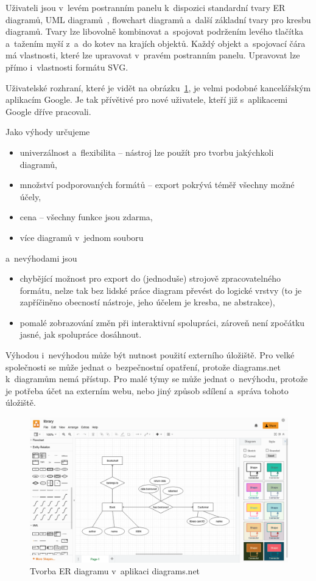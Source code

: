Uživateli jsou v~levém postranním panelu k~dispozici standardní tvary ER diagramů, UML diagramů~\cite{uml2017}, flowchart diagramů a~další základní tvary pro kresbu diagramů.
Tvary lze libovolně kombinovat a~spojovat podržením levého tlačítka a~tažením myší z~a~do kotev na krajích objektů.
Každý objekt a~spojovací čára má vlastnosti, které lze upravovat v~pravém postranním panelu.
Upravovat lze přímo i~vlastnosti formátu SVG.

Uživatelské rozhraní, které je vidět na obrázku~\ref{fig:diagrams.net}, je velmi podobné kancelářským aplikacím Google.
Je tak přívětivé pro nové uživatele, kteří již s~aplikacemi Google dříve pracovali.

Jako výhody určujeme
\begin{itemize}
  \item univerzálnost a~flexibilita -- nástroj lze použít pro tvorbu jakýchkoli diagramů,
  \item množství podporovaných formátů -- export pokrývá téměř všechny možné účely,
  \item cena -- všechny funkce jsou zdarma,
  \item více diagramů v~jednom souboru
\end{itemize}
a~nevýhodami jsou
\begin{itemize}
  \item chybějící možnost pro export do (jednoduše) strojově zpracovatelného formátu, nelze tak bez lidské práce diagram převést do logické vrstvy (to je zapříčiněno obecností nástroje, jeho účelem je kresba, ne abstrakce),
  \item pomalé zobrazování změn při interaktivní spolupráci, zároveň není zpočátku jasné, jak spolupráce dosáhnout.
\end{itemize}

Výhodou i~nevýhodou může být nutnost použití externího úložiště.
Pro velké společnosti se může jednat o~bezpečnostní opatření, protože diagrams.net k~diagramům nemá přístup.
Pro malé týmy se může jednat o~nevýhodu, protože je potřeba účet na externím webu, nebo jiný způsob sdílení a~správa tohoto úložiště.

\begin{figure}
  \centering
  \includegraphics[width = \textwidth]{../img/diagrams.net.png}
  \caption{Tvorba ER diagramu v~aplikaci diagrams.net}
  \label{fig:diagrams.net}
\end{figure}

